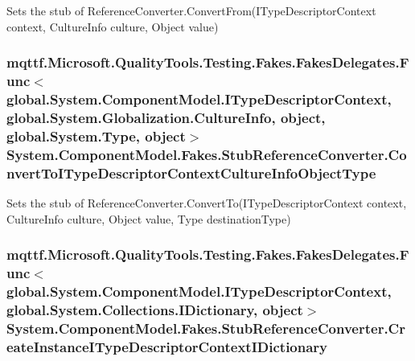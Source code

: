 Sets the stub of Reference\-Converter.\-Convert\-From(\-I\-Type\-Descriptor\-Context context, Culture\-Info culture, Object value)

\hypertarget{class_system_1_1_component_model_1_1_fakes_1_1_stub_reference_converter_aeba5b6d39f29eef558df145f236f1a1b}{
\subsubsection[{Convert\-To\-I\-Type\-Descriptor\-Context\-Culture\-Info\-Object\-Type}]{\setlength{\rightskip}{0pt plus 5cm}mqttf.\-Microsoft.\-Quality\-Tools.\-Testing.\-Fakes.\-Fakes\-Delegates.\-Func$<$global.\-System.\-Component\-Model.\-I\-Type\-Descriptor\-Context, global.\-System.\-Globalization.\-Culture\-Info, object, global.\-System.\-Type, object$>$ System.\-Component\-Model.\-Fakes.\-Stub\-Reference\-Converter.\-Convert\-To\-I\-Type\-Descriptor\-Context\-Culture\-Info\-Object\-Type}}\label{class_system_1_1_component_model_1_1_fakes_1_1_stub_reference_converter_aeba5b6d39f29eef558df145f236f1a1b}


Sets the stub of Reference\-Converter.\-Convert\-To(\-I\-Type\-Descriptor\-Context context, Culture\-Info culture, Object value, Type destination\-Type)

\hypertarget{class_system_1_1_component_model_1_1_fakes_1_1_stub_reference_converter_a0d8cf11c4ef87f37a96b696c08427702}{
\subsubsection[{Create\-Instance\-I\-Type\-Descriptor\-Context\-I\-Dictionary}]{\setlength{\rightskip}{0pt plus 5cm}mqttf.\-Microsoft.\-Quality\-Tools.\-Testing.\-Fakes.\-Fakes\-Delegates.\-Func$<$global.\-System.\-Component\-Model.\-I\-Type\-Descriptor\-Context, global.\-System.\-Collections.\-I\-Dictionary, object$>$ System.\-Component\-Model.\-Fakes.\-Stub\-Reference\-Converter.\-Create\-Instance\-I\-Type\-Descriptor\-Context\-I\-Dictionary}}\label{class_system_1_1_component_model_1_1_fakes_1_1_stub_reference_converter_a0d8cf11c4ef87f37a96b696c08427702}


